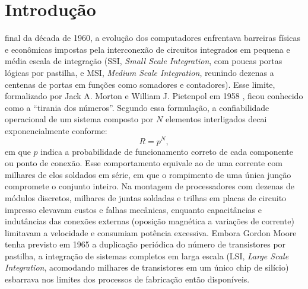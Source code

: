
\section{Introdução}
\label{sec:introducao}

 final da década de 1960, a evolução dos computadores enfrentava barreiras físicas e econômicas impostas pela interconexão de circuitos integrados em pequena e média escala de integração (SSI, \textit{Small Scale Integration}, com poucas portas lógicas por pastilha, e MSI, \textit{Medium Scale Integration}, reunindo dezenas a centenas de portas em funções como somadores e contadores). Esse limite, formalizado por Jack A. Morton e William J. Pietenpol em 1958 \cite{morton1958}, ficou conhecido como a ``tirania dos números''. Segundo essa formulação, a confiabilidade operacional de um sistema composto por $N$ elementos interligados decai exponencialmente conforme:
\begin{equation}
\label{eq:tirania_numeros}
R = p^N,
\end{equation}
em que $p$ indica a probabilidade de funcionamento correto de cada componente ou ponto de conexão. Esse comportamento equivale ao de uma corrente com milhares de elos soldados em série, em que o rompimento de uma única junção compromete o conjunto inteiro. Na montagem de processadores com dezenas de módulos discretos, milhares de juntas soldadas e trilhas em placas de circuito impresso elevavam custos e falhas mecânicas, enquanto capacitâncias e indutâncias das conexões externas (oposição magnética a variações de corrente) limitavam a velocidade e consumiam potência excessiva. Embora Gordon Moore tenha previsto em 1965 \cite{moore1965} a duplicação periódica do número de transistores por pastilha, a integração de sistemas completos em larga escala (LSI, \textit{Large Scale Integration}, acomodando milhares de transistores em um único chip de silício) esbarrava nos limites dos processos de fabricação então disponíveis.

